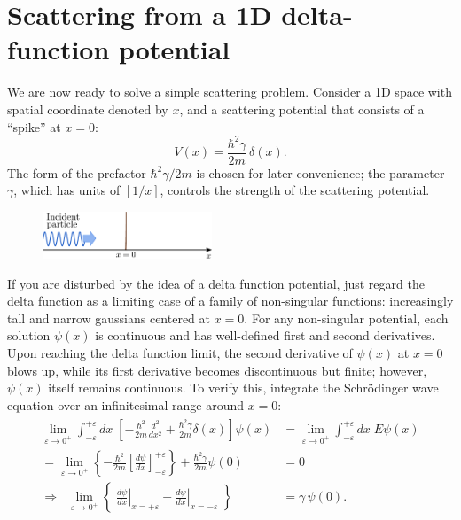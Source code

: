 \documentclass[pra,12pt]{revtex4}
\begin{document}
\section{Scattering from a 1D delta-function potential}
\label{sec:1dscatter}

We are now ready to solve a simple scattering problem.  Consider a 1D
space with spatial coordinate denoted by $x$, and a scattering
potential that consists of a ``spike'' at $x = 0$:
\begin{equation}
  V(x) = \frac{\hbar^2\gamma}{2m} \,\delta(x).
\end{equation}
The form of the prefactor $\hbar^2\gamma/2m$ is chosen for later
convenience; the parameter $\gamma$, which has units of $[1/x]$,
controls the strength of the scattering potential.

\begin{figure}[h]
  \centering\includegraphics[width=0.45\textwidth]{scattering1d}
\end{figure}

If you are disturbed by the idea of a delta function potential, just
regard the delta function as a limiting case of a family of
non-singular functions: increasingly tall and narrow gaussians
centered at $x=0$.  For any non-singular potential, each solution
$\psi(x)$ is continuous and has well-defined first and second
derivatives.  Upon reaching the delta function limit, the second
derivative of $\psi(x)$ at $x=0$ blows up, while its first derivative
becomes discontinuous but finite; however, $\psi(x)$ itself remains
continuous.  To verify this, integrate the Schr\"odinger wave equation
over an infinitesimal range around $x = 0$:
\begin{align}
  \begin{aligned}\lim_{\varepsilon\rightarrow 0^+} \int_{-\varepsilon}^{+\varepsilon} dx\; \left[-\frac{\hbar^2}{2m} \frac{d^2}{dx^2} + \frac{\hbar^2\gamma}{2m} \delta(x)\right] \psi(x) &= \lim_{\varepsilon\rightarrow 0^+} \int_{-\varepsilon}^{+\varepsilon} dx\; E \psi(x) \\ = \lim_{\varepsilon\rightarrow 0^+} \left\{-\frac{\hbar^2}{2m} \left[\frac{d\psi}{dx}\right]_{-\varepsilon}^{+\varepsilon} \right\} + \frac{\hbar^2\gamma}{2m} \psi(0) &= 0\\ \Rightarrow \;\; \lim_{\varepsilon\rightarrow 0^+} \left\{\; \left.\frac{d\psi}{dx}\right|_{x = +\varepsilon} - \left.\frac{d\psi}{dx}\right|_{x = -\varepsilon}\; \right\}  &=  \gamma \,\psi(0).\end{aligned}
  \label{delta_discontinuity}
\end{align}
\end{document}
